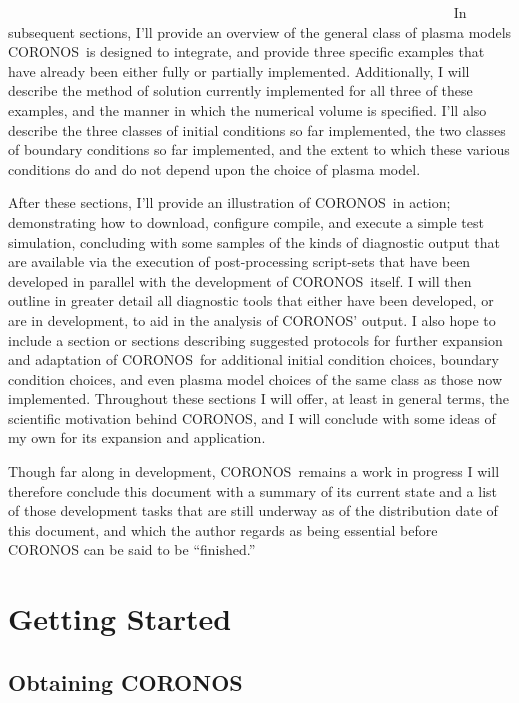 \documentclass[12pt, letterpaper, oneside, leqno, openright]{memoir}
\newcommand{\coronos}{\textsf{CORONOS}}
\begin{document}
 ~~~~~~~~~~~~~~~~~~~~~~~~~~~~~~~~~~~~~~~~~~~~~~~~~~~~~~~~~~~~~~~ %
%
In subsequent sections, I'll provide an overview of the general
class of plasma models \coronos\ is designed to integrate, and
provide three specific examples that have already been either
fully or partially implemented. Additionally, I will describe the
method of solution currently implemented for all three of these
examples, and the manner in which the numerical volume is
specified.  I'll also describe the three classes of initial
conditions so far implemented, the two classes of boundary
conditions so far implemented, and the extent to which these
various conditions do and do not depend upon the choice of plasma
model.
%
\par
%
After these sections, I'll provide an illustration of \coronos\ in
action; demonstrating how to download, configure compile, and
execute a simple test simulation, concluding with some samples of
the kinds of diagnostic output that are available via the
execution of post-processing script-sets that have been developed
in parallel with the development of \coronos\ itself. I will then
outline in greater detail all diagnostic tools that either have
been developed, or are in development, to aid in the analysis of
\coronos' output. I also hope to include a section or sections
describing suggested protocols for further expansion and
adaptation of \coronos\ for additional initial condition choices,
boundary condition choices, and even plasma model choices of the
same class as those now implemented. Throughout these sections
I will offer, at least in general terms, the scientific
motivation behind \coronos, and I will conclude with some ideas
of my own for its expansion and application.
%
\par
%
%
%
Though far along in development, \coronos\ remains a work in
progress  I will therefore conclude this document with a summary
of its current state and a list of those development tasks that
are still underway as of the distribution date of this document,
and which the author regards as being essential before \coronos
can be said to be ``finished.''
%
%
\par
%
\section{ Getting Started}
\label{sec:gettingstarted}
%
\subsection{Obtaining \coronos\ }
\label{sec:obtaining}
\end{document}

